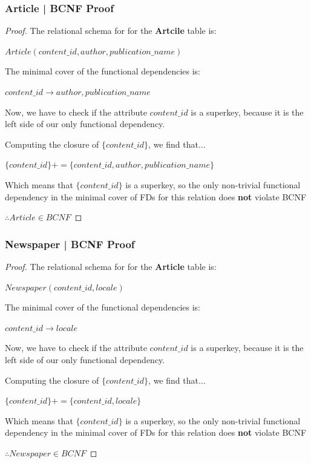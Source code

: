 \documentclass[letter, 12pt, titlepage]{article}
\begin{document}
\subsubsection{Article | BCNF Proof }

\begin{proof}


	The relational schema for for the \textbf{Artcile} table is:


	$Article(content\_id, author, publication\_name)$


	The minimal cover of the functional dependencies is:

	$ content\_id \rightarrow author, publication\_name $


	Now, we have to check if the attribute $content\_id$ is a superkey, because it is the left side of our only functional dependency.


	Computing the closure of $\{content\_id\}$, we find that...

	$\{content\_id\}+ = \{content\_id, author, publication\_name \} $

	Which means that $\{content\_id\}$ is a superkey, so the only non-trivial functional dependency in the minimal cover of FDs for this relation does \textbf{not} violate BCNF

	$\therefore Article \in BCNF $

\end{proof}



\subsubsection{Newspaper | BCNF Proof }

\begin{proof}


	The relational schema for for the \textbf{Article} table is:


	$Newspaper(content\_id, locale)$


	The minimal cover of the functional dependencies is:

	$ content\_id \rightarrow locale $

	Now, we have to check if the attribute $content\_id$ is a superkey, because it is the left side of our only functional dependency.

	Computing the closure of $\{content\_id\}$, we find that...

	$\{content\_id\}+ = \{content\_id, locale \} $

	Which means that $\{content\_id\}$ is a superkey, so the only non-trivial functional dependency in the minimal cover of FDs for this relation does \textbf{not} violate BCNF

	$\therefore Newspaper \in BCNF $

\end{proof}
\end{document}
